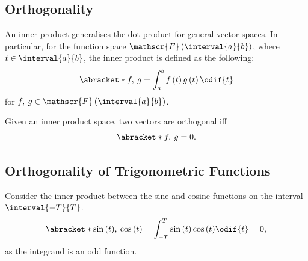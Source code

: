 \documentclass{article}
\begin{document}
\subsection{Orthogonality}
\begin{definition}
    An inner product generalises the dot product for general vector spaces.
    In particular, for the function space \(\mathscr{F}\left( \interval{a}{b} \right)\), where \(t \in \interval{a}{b}\), the
    inner product is defined as the following:
    \begin{equation*}
        \abracket*{f,\: g} = \int_a^b f\left( t \right) g\left( t \right) \odif{t}
    \end{equation*}
    for \(f,\: g \in \mathscr{F}\left( \interval{a}{b} \right)\).
\end{definition}
\begin{definition}[Orthogonality]
    Given an inner product space, two vectors are orthogonal iff
    \begin{equation*}
        \abracket*{f,\: g} = 0.
    \end{equation*}
\end{definition}
\subsection{Orthogonality of Trigonometric Functions}
Consider the inner product between the sine and cosine functions on the
interval \(\interval{-T}{T}\).
\begin{equation*}
    \abracket*{\sin{\left( t \right)},\: \cos{\left( t \right)}} = \int_{-T}^T \sin{\left( t \right)} \cos{\left( t \right)} \odif{t} = 0,
\end{equation*}
as the integrand is an odd function.
\end{document}
